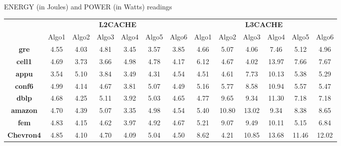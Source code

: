 \begin{table*}[th]
\caption{\capfont ENERGY (in Joules) and POWER (in Watts) readings }
\label{tab:table1}
\end{table*}


\begin{table*}[th]
\small
\centering

\begin{tabular}{ c|c|c|c|c|c|c|c|c|c|c|c|c| }
  \cline{2-13}
&
\multicolumn{6}{c}{\textbf{L2CACHE}} &
  \multicolumn{6}{|c}{\textbf{L3CACHE}} \\
  \cline{2-13}
  \multicolumn{1}{c|}{} &
  Algo1 & Algo2 & Algo3 & Algo4 & Algo5 & Algo6 & Algo1 & Algo2 & Algo3 & Algo4 & Algo5 & Algo6\\\hline
  \hline
  \multicolumn{1}{|c|}{\textbf{gre}}
& 4.55 & 4.03 & 4.81 & \cellcolor{blue!25}3.45 & 3.57 & 3.85 & 4.66 & 5.07 & \cellcolor{green!25}4.06 & 7.46 & 5.12 & 4.96 \\ \hline
  \hline
  \multicolumn{1}{|c|}{\textbf{cell1}}
& 4.69 & 3.73 & \cellcolor{blue!25}3.66 & 4.98 & 4.78 & 4.17 & 6.12 & 4.67 & \cellcolor{green!25}4.02 & 13.97 & 7.66 & 7.67\\ \hline
  \hline
  \multicolumn{1}{|c|}{\textbf{appu}}
& 3.54 & 5.10 & 3.84 & \cellcolor{blue!25}3.49 & 4.31 & 4.54 & \cellcolor{green!25}4.51 & 4.61 & 7.73 & 10.13 & 5.38 & 5.29\\ \hline
  \hline
\multicolumn{1}{|c|}{\textbf{conf6}}
& 4.99 & 4.14 & 4.67 & \cellcolor{blue!25}3.81 & 5.07 & 4.49 & \cellcolor{green!25}5.16 & 5.77 & 8.58 & 10.94 & 5.57 & 5.47\\ \hline
  \multicolumn{1}{|c|}{\textbf{dblp}}
& 4.68 & 4.25 & 5.11 & \cellcolor{blue!25}3.92 & 5.03 & 4.65 & \cellcolor{green!25}4.77 & 9.65 & 9.34 & 11.30 & 7.18 & 7.18\\ \hline
  \hline
  \multicolumn{1}{|c|}{\textbf{amazon}}
& 4.70 & 4.39 & 5.07 & \cellcolor{blue!25}3.35 & 4.98 & 4.54 & \cellcolor{green!25}5.40 & 10.80 & 13.02 & 9.34 & 8.38 & 8.65\\ \hline
  \hline
  \multicolumn{1}{|c|}{\textbf{fem}}
& 4.83 & 4.15 & 4.62 & \cellcolor{blue!25}3.97 & 4.92 & 4.67 & 5.21 & 9.07 & 9.49 & 10.11 & \cellcolor{green!25}5.15 & 6.84\\ \hline
  \hline
  \multicolumn{1}{|c|}{\textbf{Chevron4}}
& 4.85 & 4.10 & 4.70 & \cellcolor{blue!25}4.09 & 5.04 & 4.50 & 8.62 & \cellcolor{green!25}4.21 & 10.85 & 13.68 & 11.46 & 12.02\\ \hline

\end{tabular}
\end{table*}
